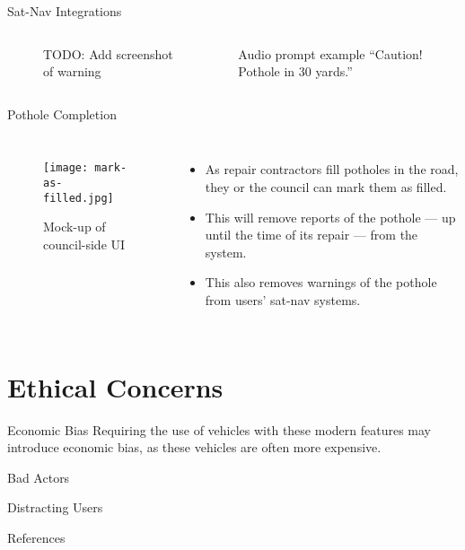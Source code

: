 \documentclass{beamer}
\begin{document}
\begin{frame}{Sat-Nav Integrations}
    \begin{columns}
        \begin{figure}
            \caption{TODO: Add screenshot of warning}
        \end{figure}


        \begin{exampleblock}{Audio prompt example}
            ``Caution! Pothole in 30 yards.''
        \end{exampleblock}
    \end{columns}
\end{frame}

\begin{frame}{Pothole Completion}
    \begin{columns}

        \begin{figure}
            \texttt{[image: mark-as-filled.jpg]}
            \caption{Mock-up of council-side UI}
        \end{figure}


        \begin{itemize}
            \item As repair contractors fill potholes in the road, they or the council can mark them as filled.
            \item This will remove reports of the pothole --- up until the time of its repair --- from the system.
            \item This also removes warnings of the pothole from users' sat-nav systems.
        \end{itemize}
    \end{columns}
\end{frame}

\section{Ethical Concerns}

\begin{frame}{Economic Bias}
Requiring the use of vehicles with these modern features may introduce economic bias, as these vehicles are often more expensive.
\end{frame}

\begin{frame}{Bad Actors}

\end{frame}

\begin{frame}{Distracting Users}

\end{frame}

\begin{frame}[allowframebreaks]{References}
    \printbibliography
\end{frame}
\end{document}
